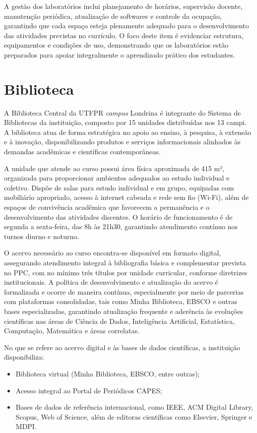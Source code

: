 A gestão dos laboratórios inclui planejamento de horários, supervisão docente, manutenção periódica, atualização de softwares e controle da ocupação, garantindo que cada espaço esteja plenamente adequado para o desenvolvimento das atividades previstas no currículo. O foco deste item é evidenciar estrutura, equipamentos e condições de uso, demonstrando que os laboratórios estão preparados para apoiar integralmente o aprendizado prático dos estudantes.

\section{Biblioteca}

A Biblioteca Central da UTFPR \textit{campus} Londrina é integrante do Sistema de Bibliotecas da instituição, composto por 15 unidades distribuídas nos 13 campi. A biblioteca atua de forma estratégica no apoio ao ensino, à pesquisa, à extensão e à inovação, disponibilizando produtos e serviços informacionais alinhados às demandas acadêmicas e científicas contemporâneas.

A unidade que atende ao curso possui área física aproximada de 415 m², organizada para proporcionar ambientes adequados ao estudo individual e coletivo. Dispõe de salas para estudo individual e em grupo, equipadas com mobiliário apropriado, acesso à internet cabeada e rede sem fio (Wi-Fi), além de espaços de convivência acadêmica que favorecem a permanência e o desenvolvimento das atividades discentes. O horário de funcionamento é de segunda a sexta-feira, das 8h às 21h30, garantindo atendimento contínuo nos turnos diurno e noturno.

O acervo necessário ao curso encontra-se disponível em formato digital, assegurando atendimento integral à bibliografia básica e complementar prevista no PPC, com no mínimo três títulos por unidade curricular, conforme diretrizes institucionais. A política de desenvolvimento e atualização do acervo é formalizada e ocorre de maneira contínua, especialmente por meio de parcerias com plataformas consolidadas, tais como Minha Biblioteca, EBSCO e outras bases especializadas, garantindo atualização frequente e aderência às evoluções científicas nas áreas de Ciência de Dados, Inteligência Artificial, Estatística, Computação, Matemática e áreas correlatas.

No que se refere ao acervo digital e às bases de dados científicas, a instituição disponibiliza:

\begin{itemize}
    \item Biblioteca virtual (Minha Biblioteca, EBSCO, entre outras);
    \item Acesso integral ao Portal de Periódicos CAPES;
    \item Bases de dados de referência internacional, como IEEE, ACM Digital Library, Scopus, Web of Science, além de editoras científicas como Elsevier, Springer e MDPI.
\end{itemize}

